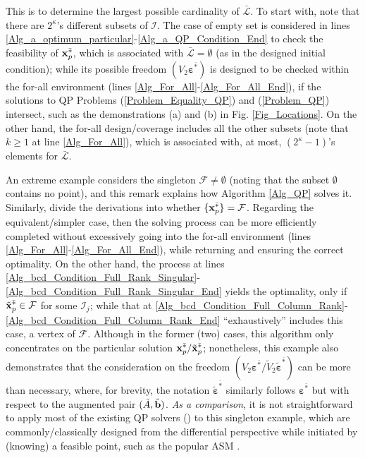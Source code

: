 \documentclass{imaman}
\newcommand{\bfb}{{\bf b}}
\newcommand{\bfx}{{\bf x}}
\newcommand{\bfvarepsilon}{{\boldsymbol \varepsilon}}
\newcommand{\calF}{{\mathcal F}}
\newcommand{\calI}{{\mathcal I}}
\newcommand{\calL}{{\mathcal L}}
\numberwithin{equation}{section}
\begin{document}
\begin{remark}
This is to determine the largest possible cardinality of $\bar\calL$. To start with, note that there are $2^\kappa$'s different subsets of $\calI$. The case of empty set is considered in lines \ref{Alg_a_optimum_particular}-\ref{Alg_a_QP_Condition_End} to check the feasibility of $\bfx_p^{\bar *}$, which is associated with $\bar\calL=\emptyset$ (as in the designed initial condition); while its possible freedom $(V_2\bfvarepsilon^{\bar *})$ is designed to be checked within the for-all environment (lines \ref{Alg_For_All}-\ref{Alg_For_All_End}), if the solutions to QP Problems (\ref{Problem_Equality_QP}) and (\ref{Problem_QP}) intersect, such as the demonstrations (a) and (b) in Fig. \ref{Fig_Locations}. On the other hand, the for-all design/coverage includes all the other subsets (note that $k\ge 1$ at line \ref{Alg_For_All}), which is associated with, at most, $(2^\kappa-1)$'s elements for $\bar\calL$.
\label{Rem_Candidates_Cardinality}
\end{remark}

\begin{remark}
An extreme example considers the singleton $\calF\ne\emptyset$ (noting that the subset $\emptyset$ contains no point), and this remark explains how Algorithm \ref{Alg_QP} solves it. Similarly, divide the derivations into whether $\{\bfx_p^{\bar *}\}=\calF$. Regarding the equivalent/simpler case, then the solving process can be more efficiently completed without excessively going into the for-all environment (lines \ref{Alg_For_All}-\ref{Alg_For_All_End}), while returning and ensuring the correct optimality. On the other hand, the process at lines \ref{Alg_bcd_Condition_Full_Rank_Singular}-\ref{Alg_bcd_Condition_Full_Rank_Singular_End} yields the optimality, only if $\tilde\bfx_p^{\bar *}\in\calF$ for some $\calI_j$; while that at \ref{Alg_bcd_Condition_Full_Column_Rank}-\ref{Alg_bcd_Condition_Full_Column_Rank_End} ``exhaustively'' includes this case, a vertex of $\calF$. Although in the former (two) cases, this algorithm only concentrates on the particular solution $\bfx_p^{\bar *}/\tilde\bfx_p^{\bar *}$; nonetheless, this example also demonstrates that the consideration on the freedom $(V_2\bfvarepsilon^{\bar *}/\tilde V_2\tilde\bfvarepsilon^{\bar *})$ can be more than necessary, where, for brevity, the notation $\tilde\bfvarepsilon^{\bar *}$ similarly follows $\bfvarepsilon^{\bar *}$ but with respect to the augmented pair $(\tilde A,\tilde\bfb)$. \textit{As a comparison}, it is not straightforward to apply most of the existing QP solvers (\cite{BoVa:04,NoWr:06}) to this singleton example, which are commonly/classically designed from the differential perspective while initiated by (knowing) a feasible point, such as the popular ASM \cite{Lu(Ye):03(16)}.
\label{Rem_QP_Singleton_F}
\end{remark}
\end{document}
